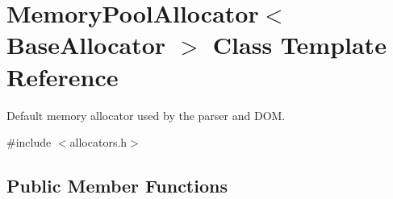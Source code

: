 \hypertarget{classMemoryPoolAllocator}{}\section{Memory\+Pool\+Allocator$<$ Base\+Allocator $>$ Class Template Reference}
\label{classMemoryPoolAllocator}


Default memory allocator used by the parser and D\+OM.  




{\ttfamily \#include $<$allocators.\+h$>$}

\subsection*{Public Member Functions}
